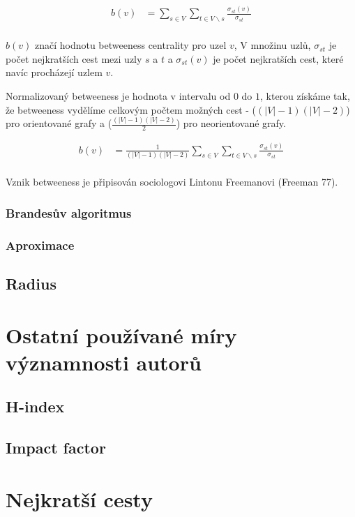 \documentclass[12pt,titlepage]{report}
\begin{document}
\begin{align*}
b(v) &= \displaystyle\sum\limits_{s \in V} \displaystyle\sum\limits_{t \in V \backslash s} \frac{\sigma_{st}(v)}{\sigma_{st}} \\
\end{align*}

$b(v)$ značí hodnotu betweeness centrality pro uzel $v$, V množinu uzlů,
$\sigma_{st}$ je počet nejkratších cest mezi uzly $s$ a $t$ a $\sigma_{st}(v)$
je počet nejkratších cest, které navíc procházejí uzlem $v$.

Normalizovaný betweeness je hodnota v intervalu od $0$ do $1$, kterou získáme
tak, že betweeness vydělíme celkovým počtem možných cest - ($(|V| - 1)(|V| -
2)$) pro orientované grafy a ($\frac{(|V| - 1)(|V| - 2)}{2}$) pro neorientované
grafy.

\begin{align*}
b(v) &= \frac{1}{(|V| - 1)(|V| - 2)} \displaystyle\sum\limits_{s \in V} \displaystyle\sum\limits_{t \in V \backslash s} \frac{\sigma_{st}(v)}{\sigma_{st}} \\
\end{align*}

Vznik betweeness je připisován sociologovi Lintonu Freemanovi (Freeman 77).

\subsubsection{Brandesův algoritmus}
\subsubsection{Aproximace}
\subsection{Radius}

\section{Ostatní používané míry významnosti autorů}
\subsection{H-index}
\subsection{Impact factor}

\section{Nejkratší cesty}
\end{document}
